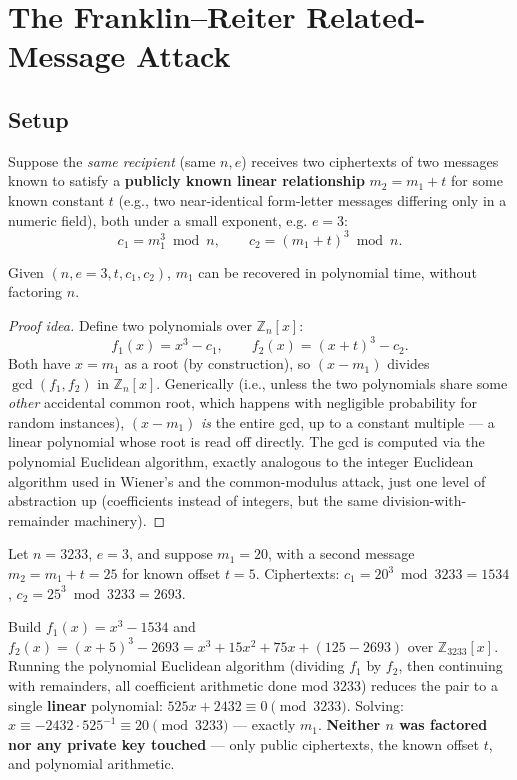 \newpage
\section{The Franklin--Reiter Related-Message Attack}

\subsection{Setup}
Suppose the \emph{same recipient} (same $n, e$) receives two ciphertexts of two messages known to satisfy a \textbf{publicly known linear relationship} $m_2 = m_1 + t$ for some known constant $t$ (e.g., two near-identical form-letter messages differing only in a numeric field), both under a small exponent, e.g. $e=3$:
\[
c_1 = m_1^{3} \bmod n, \qquad c_2 = (m_1+t)^{3} \bmod n.
\]

\begin{theorem}
Given $(n, e{=}3, t, c_1, c_2)$, $m_1$ can be recovered in polynomial time, without factoring $n$.
\end{theorem}

\begin{proof}[Proof idea]
Define two polynomials over $\mathbb{Z}_n[x]$:
\[
f_1(x) = x^3 - c_1, \qquad f_2(x) = (x+t)^3 - c_2.
\]
Both have $x = m_1$ as a root (by construction), so $(x - m_1)$ divides $\gcd(f_1,f_2)$ in $\mathbb{Z}_n[x]$. Generically (i.e., unless the two polynomials share some \emph{other} accidental common root, which happens with negligible probability for random instances), $(x-m_1)$ \emph{is} the entire gcd, up to a constant multiple — a linear polynomial whose root is read off directly. The gcd is computed via the polynomial Euclidean algorithm, exactly analogous to the integer Euclidean algorithm used in Wiener's and the common-modulus attack, just one level of abstraction up (coefficients instead of integers, but the same division-with-remainder machinery).
\end{proof}

\begin{example}
Let $n=3233$, $e=3$, and suppose $m_1 = 20$, with a second message $m_2 = m_1 + t = 25$ for known offset $t=5$. Ciphertexts: $c_1 = 20^3 \bmod 3233 = 1534$, $c_2 = 25^3 \bmod 3233 = 2693$.

Build $f_1(x) = x^3 - 1534$ and $f_2(x) = (x+5)^3 - 2693 = x^3 + 15x^2 + 75x + (125-2693)$ over $\mathbb{Z}_{3233}[x]$. Running the polynomial Euclidean algorithm (dividing $f_1$ by $f_2$, then continuing with remainders, all coefficient arithmetic done mod $3233$) reduces the pair to a single \textbf{linear} polynomial: $525x + 2432 \equiv 0 \pmod{3233}$. Solving: $x \equiv -2432 \cdot 525^{-1} \equiv 20 \pmod{3233}$ — exactly $m_1$. \textbf{Neither $n$ was factored nor any private key touched} — only public ciphertexts, the known offset $t$, and polynomial arithmetic.
\end{example}


